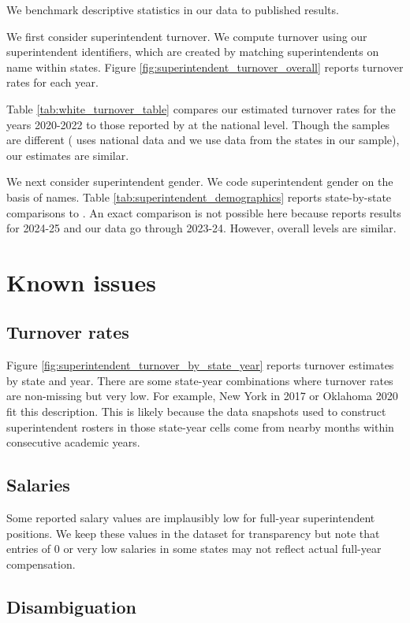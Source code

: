 \documentclass[12pt]{article}
\begin{document}
We benchmark descriptive statistics in our data to published results. 

We first consider superintendent turnover. We compute turnover using our superintendent identifiers, which are created by matching superintendents on name within states. Figure \ref{fig:superintendent_turnover_overall}  reports turnover rates for each year. 

Table \ref{tab:white_turnover_table} compares our estimated turnover rates for the years 2020-2022 to those reported by \citet{white} at the national level. Though the samples are different (\citet{white} uses national data and we use data from the states in our sample), our estimates are similar.  

We next consider superintendent gender. We code superintendent gender on the basis of names. Table \ref{tab:superintendent_demographics} reports state-by-state comparisons to \citet{superintendentlab}. An exact comparison is not possible here because \citet{superintendentlab} reports results for 2024-25 and our data go through 2023-24. However, overall levels are similar. 

\section{Known issues}

\subsection{Turnover rates}
Figure \ref{fig:superintendent_turnover_by_state_year} reports turnover estimates by state and year. There are some state-year combinations where turnover rates are non-missing but very low. For example,  New York in 2017 or Oklahoma 2020 fit this description. This is likely because the data snapshots used to construct superintendent rosters in those state-year cells come from nearby months  within consecutive academic years. 

\subsection{Salaries}
Some reported salary values are implausibly low for full-year superintendent positions. We keep these values in the dataset for transparency but note that entries of 0 or very low salaries in some states may not reflect actual full-year compensation.

\subsection{Disambiguation}
\end{document}
